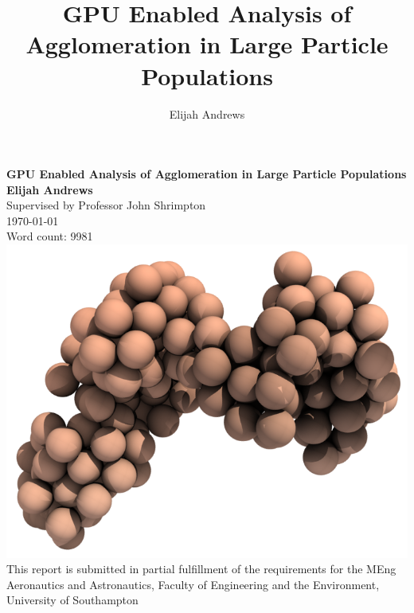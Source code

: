 \documentclass[a4paper,11pt,titlepage]{report}
\author{Elijah Andrews}
\title{GPU Enabled Analysis of Agglomeration in Large Particle Populations}
\begin{document}
\begin{titlepage}
    \begin{center}
        \vspace*{1cm}
        \Huge\textbf{GPU Enabled Analysis of Agglomeration in Large Particle Populations}
        \vspace{1.5cm}
        \\\Large\textbf{Elijah Andrews}
        \vspace{0.5cm}
        \\Supervised by Professor John Shrimpton
        \vspace{0.5cm}
        \\\today
        \vspace{0.5cm}
        \\Word count: 9981
        \vspace{1.5cm}
        \\\includegraphics[scale=0.55]{figures/front_page.png}
        \vfill
        \normalsize This report is submitted in partial fulfillment of the requirements for the MEng Aeronautics and Astronautics, Faculty of Engineering and the Environment, University of Southampton
        \vspace{0.8cm}
    \end{center}
\end{titlepage}
\end{document}

